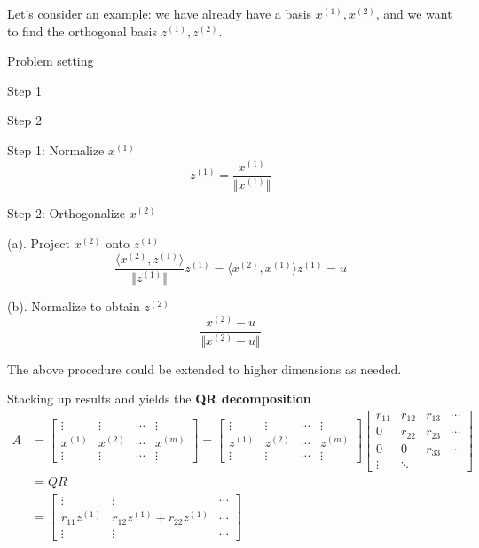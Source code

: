 Let's consider an example: we have already have a basis ${x^{(1)}, x^{(2)}}$, and we want to find the orthogonal basis ${z^{(1)}, z^{(2)}}$.

\begin{marginfigure}
	\centering
	\resizebox{7.5cm}{3cm}{}
	\caption{Problem setting}
	\label{}
\end{marginfigure}

\begin{marginfigure}
	\centering
	\resizebox{7.5cm}{3cm}{}
	\caption{Step 1}
	\label{}
\end{marginfigure}

\begin{marginfigure}
	\centering
	\resizebox{7.5cm}{3cm}{}
	\caption{Step 2}
	\label{}
\end{marginfigure}

Step 1: Normalize $x^{(1)}$
$$z^{(1)}=\frac{x^{(1)}}{\Vert x^{(1)}\Vert}$$

Step 2: Orthogonalize $x^{(2)}$

\quad (a). Project $x^{(2)}$ onto $z^{(1)}$
$$\frac{\langle x^{(2)},z^{(1)}\rangle}{\Vert z^{(1)}\Vert} z^{(1)}=\langle x^{(2)},x^{(1)}\rangle z^{(1)}=u$$

\quad (b). Normalize to obtain $z^{(2)}$
$$\frac{x^{(2)}-u}{\Vert x^{(2)}-u\Vert}$$

The above procedure could be extended to higher dimensions as needed.

\vspace{0.4cm}
Stacking up results and yields the \textbf{QR decomposition}
\begin{align*}
	A&=\left[\begin{matrix}
	\vdots&\vdots&\cdots&\vdots\\
	x^{(1)}&x^{(2)}&\cdots&x^{(m)}\\
	\vdots&\vdots&\cdots&\vdots
	\end{matrix}\right]=\left[\begin{matrix}
	\vdots&\vdots&\cdots&\vdots\\
	z^{(1)}&z^{(2)}&\cdots&z^{(m)}\\
	\vdots&\vdots&\cdots&\vdots
	\end{matrix}\right]
	\left[\begin{matrix}
	r_{11}&r_{12}&r_{13}&\cdots\\
	0&r_{22}&r_{23}&\cdots\\
	0&0&r_{33}&\cdots\\
	\vdots&\ddots& & 
	\end{matrix}\right]\\
	&=QR\\
	&=\left[\begin{matrix}
	\vdots&\vdots&\cdots\\
	r_{11}z^{(1)}&r_{12}z^{(1)}+r_{22}z^{(1)}&\cdots \\
	\vdots&\vdots&\cdots 
	\end{matrix}\right]
\end{align*}

